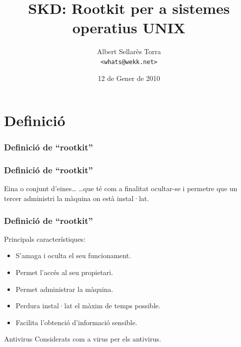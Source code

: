 \documentclass{beamer}
\title{SKD: Rootkit per a sistemes operatius UNIX}
\author{Albert Sellarès Torra \\ \texttt{<whats@wekk.net>}}
\institute{Facultat d'Informàtica de Barcelona}
\date{12 de Gener de 2010}
\begin{document}
\frame{\titlepage}

\frame{\tableofcontents}
%
%
%
%

\section{Definició}
\begin{frame}
	\frametitle{Definició de ``rootkit''}
\end{frame}

\begin{frame}
	\frametitle{Definició de ``rootkit''}
	\begin{block}{Eina o conjunt d'eines\ldots}
		\ldots que té com a finalitat ocultar-se i permetre que un tercer administri la màquina on està 
		instal·lat.
	\end{block}
\end{frame}


\begin{frame}
	\frametitle{Definició de ``rootkit''}
	\begin{block}{Principals característiques:}
		\begin{itemize}
			\item S'amaga i oculta el seu funcionament.
			\item Permet l'accés al seu propietari.
			\item Permet administrar la màquina.
			\item Perdura instal·lat el màxim de temps possible.
			\item Facilita l'obtenció d'informació sensible.
		\end{itemize}
	\end{block}
	\begin{block}{Antivirus}
		Considerats com a virus per els antivirus.
	\end{block}
\end{frame}
\end{document}
